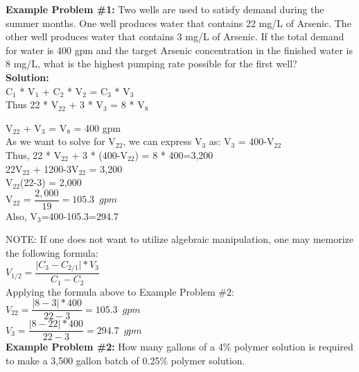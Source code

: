 \textbf{Example Problem \#1:} Two wells are used to satisfy demand during the summer months. One well produces water that contains 22 mg/L of Arsenic. The other well produces water that contains 3 mg/L of Arsenic. If the total demand for water is 400 gpm and the target Arsenic concentration in the finished water is 8 mg/L, what is the highest pumping rate possible for the first well?\\
\vspace{0.3cm}
\textbf{Solution:}\\
C$_1$ * V$_1$ + C$_2$ * V$_2$ =  C$_3$ * V$_3$\\
\vspace{0.3cm}
Thus 22 * V$_{22}$ + 3 * V$_3$ =  8 * V$_8$\\
\vspace{0.3cm}

V$_{22}$ + V$_3$ = V$_8$ = 400 gpm\\
\vspace{0.3cm}
As we want to solve for V$_{22}$, we can express V$_3$ as: V$_3$ = 400-V$_{22}$\\
\vspace{0.3cm}
Thus, 22 * V$_{22}$ + 3 * (400-V$_{22}$) =  8 * 400=3,200\\
\vspace{0.3cm}
22V$_{22}$ + 1200-3V$_{22}$ =  3,200\\
\vspace{0.3cm}
V$_{22}$(22-3) =  2,000\\
\vspace{0.3cm}
V$_{22}$ = $ \dfrac{2,000}{19}=\boxed{105.3 \enspace gpm}$\\
\vspace{0.3cm}
Also, V$_3$=400-105.3=294.7\\
\vspace{0.3cm}

NOTE:  If one does not want to utilize algebraic manipulation, one may memorize the following formula:\\
\vspace{0.3cm}
$V_{1/2}=\dfrac{\lvert C_3 - C_{2/1}\rvert*V_3}{C_1-C_2}$\\
\vspace{0.3cm}
Applying the formula above to Example Problem \#2:\\
\vspace{0.3cm}
$V_{22}=\dfrac{\lvert 8 - 3\rvert*400}{22-3}=\boxed{105.3 \enspace gpm}$\\
\vspace{0.3cm}
$V_{3}=\dfrac{\lvert 8 - 22\rvert*400}{22-3}=\boxed{294.7 \enspace gpm}$\\
\vspace{0.3cm}
\textbf{Example Problem \#2:}  How many gallons of a 4\% polymer solution is required to make a 3,500 gallon batch of 0.25\% polymer solution.\\

